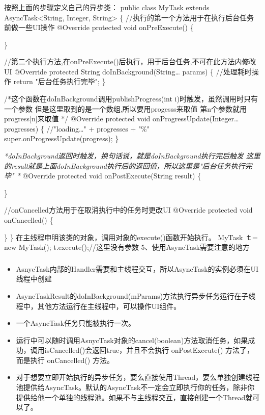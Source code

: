 \documentclass[9pt, b5paper]{article}
\begin{document}
\subsubsection{}
\label{sec-9-0-4}
按照上面的步骤定义自己的异步类：
public class MyTask extends AsyncTask<String, Integer, String> \{  
    //执行的第一个方法用于在执行后台任务前做一些UI操作  
    @Override  
    protected void onPreExecute() \{  

\}  

//第二个执行方法,在onPreExecute()后执行，用于后台任务,不可在此方法内修改UI
@Override  
protected String doInBackground(String\ldots{} params) \{  
     //处理耗时操作
    return "后台任务执行完毕";  
\}  

/*这个函数在doInBackground调用publishProgress(int i)时触发，虽然调用时只有一个参数  
 但是这里取到的是一个数组,所以要用progesss\footnotemark[2]{}来取值  
 第n个参数就用progress[n]来取值   */
 @Override  
 protected void onProgressUpdate(Integer\ldots{} progresses) \{  
     //"loading\ldots{}" + progresses\footnotemark[2]{} + "\%"
     super.onProgressUpdate(progress);  
 \}  

\emph{*doInBackground返回时触发，换句话说，就是doInBackground执行完后触发  
这里的result就是上面doInBackground执行后的返回值，所以这里是"后台任务执行完毕"  *}
@Override  
protected void onPostExecute(String result) \{ 

\}  

//onCancelled方法用于在取消执行中的任务时更改UI  
@Override  
protected void onCancelled() \{  

    \}  
\}
在主线程申明该类的对象，调用对象的execute()函数开始执行。
MyTask ｔ= new MyTask();
t.execute();//这里没有参数
 5、使用AsyncTask需要注意的地方
\subsubsection{}
\label{sec-9-0-5}
\begin{itemize}
\item AsnycTask内部的Handler需要和主线程交互，所以AsyncTask的实例必须在UI线程中创建
\item AsyncTaskResult的doInBackground(mParams)方法执行异步任务运行在子线程中，其他方法运行在主线程中，可以操作UI组件。
\item 一个AsyncTask任务只能被执行一次。
\item 运行中可以随时调用AsnycTask对象的cancel(boolean)方法取消任务，如果成功，调用isCancelled()会返回true，并且不会执行 onPostExecute() 方法了，而是执行 onCancelled() 方法。
\item 对于想要立即开始执行的异步任务，要么直接使用Thread，要么单独创建线程池提供给AsyncTask。默认的AsyncTask不一定会立即执行你的任务，除非你提供给他一个单独的线程池。如果不与主线程交互，直接创建一个Thread就可以了。
\end{itemize}
　　
\end{document}
